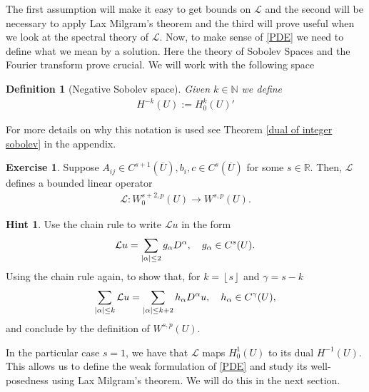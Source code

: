\documentclass[
    a4paper,
    DIV=14,
    abstract=true,
    numbers=noenddot
]
{scrartcl}
\newtheorem{definition}[theorem]{Definition}
\theoremstyle{definition}
\newtheorem{exercise}{Exercise}
\newtheorem*{hint}{Hint}
\newcommand{\N}{\mathbb{N}}
\newcommand{\R}{\mathbb{R}}
\newcommand{\Ll}{\mathcal{L}}
\begin{document}
The first assumption will make it easy to get bounds on $\Ll$ and the second will be necessary to apply Lax Milgram's theorem and the third will prove useful when we look at the spectral theory of $\Ll$. Now, to make sense of \eqref{PDE} we need to define what we mean by a solution. Here the theory of Sobolev Spaces and the Fourier transform prove crucial. We will work with the following space
\begin{definition}[Negative Sobolev space]\label{dual definition 2}
    Given $k \in \N$ we define
    \begin{align*}
        H^{-k}(U ):= H_0^k(U )'
    \end{align*}
\end{definition}
For more details on why this notation is used see Theorem \ref{dual of integer sobolev} in the appendix.
\begin{exercise}\label{domain L}
    Suppose $A_{ij} \in C^{s+1}(\overline{U} ), b_i, c \in C^{s}(\overline{U} )$   for some $s \in \R$. Then, $\Ll $ defines  a bounded linear operator
    \begin{align*}
        \Ll : W_0^{s+2,p}(U)\to W^{s,p} (U).
    \end{align*}
\end{exercise}
\begin{hint}
    Use the chain rule to write $\Ll u$ in the form
    \begin{align*}
        \Ll u =\sum_{\abs{\alpha} \leq 2 } g_\alpha D^\alpha, \quad g_\alpha \in C ^{s}(U).
    \end{align*}
    Using the chain rule again, to show that, for $k=\left\lfloor s \right\rfloor$ and $\gamma =s-k$
    \begin{align*}
        \sum_{\abs{\alpha} \leq k} \Ll u = \sum_{\abs{\alpha} \leq k+2} h_\alpha D^\alpha u, \quad h_\alpha \in C^{\gamma }(U),
    \end{align*}
    and conclude by the definition of $W^{s,p}(U)$.
\end{hint}
In the particular case $s=1$,  we have that $\Ll $ maps $H_0^1(U)$ to its dual $H^{-1}(U)$. This allows us to define the weak formulation of \eqref{PDE} and study its well-posedness using Lax Milgram's theorem. We will do this in the next section.
\end{document}
